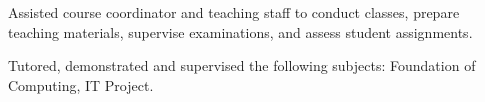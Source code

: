 \documentclass{cv}
\begin{document}
\begin{list}{}{\setlength{\leftmargin}{0pt}}
    \begin{list}{\raisebox{2.0pt}{\tiny$\bullet$}\space}{\setlength{\leftmargin}{11.2pt}}
        \itemsep -4.0pt \vspace{-4.0pt}
        \item Assisted course coordinator and teaching staff to conduct classes, prepare teaching materials, supervise examinations, and assess student assignments.
        \item Tutored, demonstrated and supervised the following subjects: Foundation of Computing, IT Project.
    \end{list}
\end{list}

\end{document}
